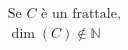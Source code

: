 \documentclass[preview]{standalone}
\begin{document}
\begin{align*}
&\text{Se } C \text{ è un frattale, } \\ &\operatorname{dim}(C) \not \in \mathbb{N}
\end{align*}
\end{document}
